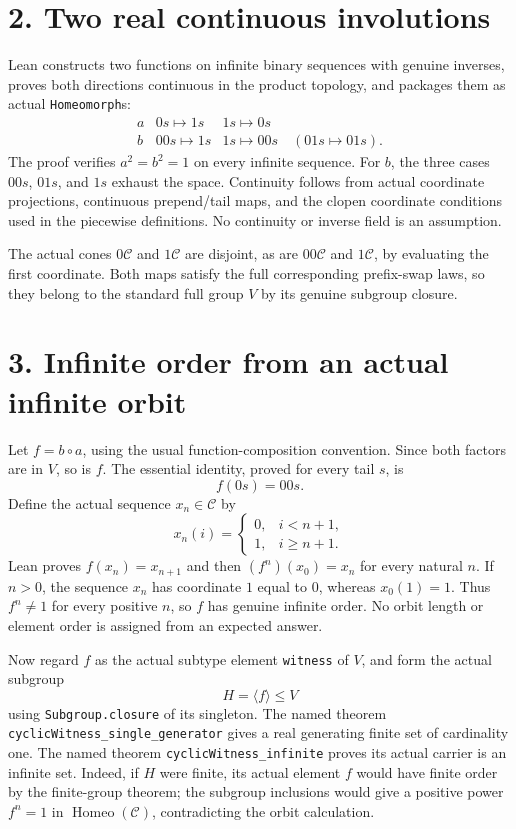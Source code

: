 \documentclass[10pt]{article}
\begin{document}
\section*{2. Two real continuous involutions}
Lean constructs two functions on infinite binary sequences with genuine inverses, proves both directions continuous in the product topology, and packages them as actual \texttt{Homeomorph}s:
\[
\begin{array}{c|cc}
 a & 0s\mapsto1s & 1s\mapsto0s\\ \hline
 b & 00s\mapsto1s & 1s\mapsto00s\quad (01s\mapsto01s).
\end{array}
\]
The proof verifies $a^2=b^2=1$ on every infinite sequence. For $b$, the three cases $00s$, $01s$, and $1s$ exhaust the space. Continuity follows from actual coordinate projections, continuous prepend/tail maps, and the clopen coordinate conditions used in the piecewise definitions. No continuity or inverse field is an assumption.

The actual cones $0\mathcal C$ and $1\mathcal C$ are disjoint, as are $00\mathcal C$ and $1\mathcal C$, by evaluating the first coordinate. Both maps satisfy the full corresponding prefix-swap laws, so they belong to the standard full group $V$ by its genuine subgroup closure.

\section*{3. Infinite order from an actual infinite orbit}
Let $f=b\circ a$, using the usual function-composition convention. Since both factors are in $V$, so is $f$. The essential identity, proved for every tail $s$, is
\[
 f(0s)=00s.
\]
Define the actual sequence $x_n\in\mathcal C$ by
\[
 x_n(i)=\begin{cases}0,&i<n+1,\\1,&i\ge n+1.\end{cases}
\]
Lean proves $f(x_n)=x_{n+1}$ and then $(f^n)(x_0)=x_n$ for every natural $n$. If $n>0$, the sequence $x_n$ has coordinate $1$ equal to $0$, whereas $x_0(1)=1$. Thus $f^n\ne1$ for every positive $n$, so $f$ has genuine infinite order. No orbit length or element order is assigned from an expected answer.

Now regard $f$ as the actual subtype element \texttt{witness} of $V$, and form the actual subgroup
\[
 H=\langle f\rangle\le V
\]
using \texttt{Subgroup.closure} of its singleton. The named theorem \texttt{cyclicWitness\_single\_generator} gives a real generating finite set of cardinality one. The named theorem \texttt{cyclicWitness\_infinite} proves its actual carrier is an infinite set. Indeed, if $H$ were finite, its actual element $f$ would have finite order by the finite-group theorem; the subgroup inclusions would give a positive power $f^n=1$ in $\operatorname{Homeo}(\mathcal C)$, contradicting the orbit calculation.
\end{document}
